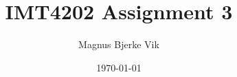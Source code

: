 \documentclass[notitlepage, 11pt]{article}
\title{IMT4202 Assignment 3}
\author{Magnus Bjerke Vik}
\date{\today}
\begin{document}
\maketitle


\begin{appendices}
	
\end{appendices}
\end{document}
